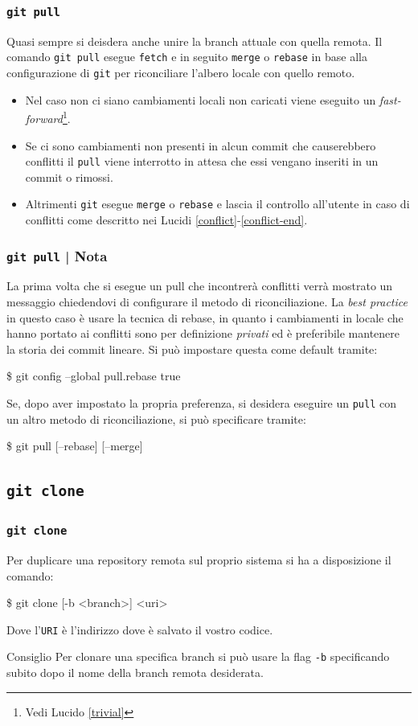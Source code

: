 \documentclass{beamer}
\begin{document}
\begin{frame}
  \frametitle{\texttt{git pull}}
  Quasi sempre si deisdera anche unire la branch attuale con quella remota.
  Il comando \texttt{git pull} esegue \texttt{fetch} e in seguito \texttt{merge}
  o \texttt{rebase} in base alla configurazione di \texttt{git} per riconciliare l'albero
  locale con quello remoto. \\ \pause
  \begin{itemize}
    \item Nel caso non ci siano cambiamenti locali non caricati viene eseguito
      un \emph{fast-forward}\footnote{Vedi Lucido \ref{trivial}}.
    \item Se ci sono cambiamenti non presenti in alcun commit che causerebbero
      conflitti il \texttt{pull} viene interrotto in attesa che essi vengano
      inseriti in un commit o rimossi.
    \item Altrimenti \texttt{git} esegue \texttt{merge} o \texttt{rebase} e lascia il
      controllo all'utente in caso di conflitti come descritto nei
      Lucidi \ref{conflict}-\ref{conflict-end}.
  \end{itemize}
\end{frame}

\begin{frame}
  \frametitle{\texttt{git pull} | Nota}
  La prima volta che si esegue un pull che incontrer\`a conflitti verr\`a
  mostrato un messaggio chiedendovi di configurare il metodo di riconciliazione.
  La \emph{best practice} in questo caso \`e usare la tecnica di rebase, in
  quanto i cambiamenti in locale che hanno portato ai conflitti sono per
  definizione \emph{privati} ed \`e preferibile mantenere la storia dei commit
  lineare. Si pu\`o impostare questa come default tramite:
  \begin{semiverbatim}
  \$ git config --global pull.rebase true
  \end{semiverbatim}
  \pause
  Se, dopo aver impostato la propria preferenza, si desidera eseguire un
  \texttt{pull} con un altro metodo di riconciliazione, si pu\`o specificare tramite:
  \begin{semiverbatim}
  \$ git pull [--rebase] [--merge]
  \end{semiverbatim}
\end{frame}

\subsection{\texttt{git clone}}
\begin{frame}
  \frametitle{\texttt{git clone}}
  Per duplicare una repository remota sul proprio sistema si ha a disposizione
  il comando:
  \begin{semiverbatim}
  \$ git clone [-b <branch>] <uri>
  \end{semiverbatim}
  Dove l'\texttt{URI} \`e l'indirizzo dove \`e salvato il vostro codice.
  \pause
  \begin{block}{Consiglio}
    Per clonare una specifica branch si pu\`o usare la flag \texttt{-b}
    specificando subito dopo il nome della branch remota desiderata.
  \end{block}
\end{frame}
\end{document}
